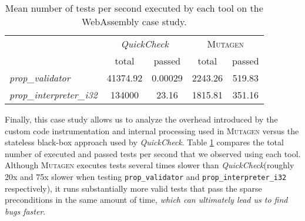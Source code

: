 \documentclass[sigconf,review,anonymous]{acmart}
\newcommand{\quickcheck}{\textit{QuickCheck}\xspace}
\newcommand{\mutagen}{\textsc{Mutagen}\xspace}
\begin{document}
\begin{table}[t]
\footnotesize
\begin{tabular}{|l|c|c|c|c|}
\hline
\multicolumn{1}{|c|}{
  \multirow{2}{*}{Property}}
  & \multicolumn{2}{c|}{\quickcheck}
  & \multicolumn{2}{c|}{\mutagen} \\
  \cline{2-5}
  \multicolumn{1}{|c|}{}
  & \multicolumn{1}{c|}{total}
  & passed
  & \multicolumn{1}{c|}{total}
  & passed \\
\hline
\textit{prop\_validator}
& 41374.92
& 0.00029
& 2243.26
& 519.83\\
\hline
\textit{prop\_interpreter\_i32}
& 134000
& 23.16
& 1815.81
& 351.16 \\
\hline
\end{tabular}
\caption{\label{table:wasm:overhead}Mean number of tests per second executed by
  each tool on the WebAssembly case study.}
\vspace{-10pt}
\end{table}


Finally, this case study allows us to analyze the overhead introduced by the
custom code instrumentation and internal processing used in \mutagen versus the
stateless black-box approach used by \quickcheck.
%
Table \ref{table:wasm:overhead} compares the total number of executed and passed
tests per second that we observed using each tool.
%
Although \mutagen executes tests several times slower than \quickcheck (roughly
20x and 75x slower when testing \texttt{prop\_validator} and
\texttt{prop\_interpreter\_i32} respectively),
%
it runs substantially more valid tests that pass the sparse preconditions in the
same amount of time, \emph{which can ultimately lead us to find bugs faster}.



\end{document}
